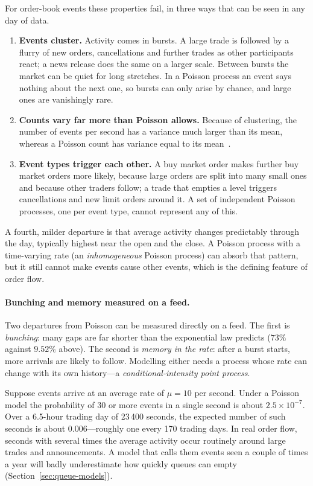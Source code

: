 For order-book events these properties fail, in three ways that can be seen in any day of data.
\begin{enumerate}[leftmargin=1.8em,itemsep=2pt]
\item \textbf{Events cluster.} Activity comes in bursts. A large trade is followed by a flurry of
  new orders, cancellations and further trades as other participants react; a news release does the
  same on a larger scale. Between bursts the market can be quiet for long stretches. In a Poisson
  process an event says nothing about the next one, so bursts can only arise by chance, and large
  ones are vanishingly rare.
\item \textbf{Counts vary far more than Poisson allows.} Because of clustering, the number of events
  per second has a variance much larger than its mean, whereas a Poisson count has variance equal to
  its mean~\citep{bacry2015}.
\item \textbf{Event types trigger each other.} A buy market order makes further buy market orders
  more likely, because large orders are split into many small ones and because other traders
  follow; a trade that empties a level triggers cancellations and new limit orders around it. A
  set of independent Poisson processes, one per event type, cannot represent any of this.
\end{enumerate}
A fourth, milder departure is that average activity changes predictably through the day, typically
highest near the open and the close. A Poisson process with a time-varying rate (an
\emph{inhomogeneous} Poisson process) can absorb that pattern, but it still cannot make events
cause other events, which is the defining feature of order flow.

\paragraph{Bunching and memory measured on a feed.} Two departures from Poisson can be measured directly on a feed. The first is \emph{bunching}: many gaps are
far shorter than the exponential law predicts ($73\%$ against $9.52\%$ above). The second is
\emph{memory in the rate}: after a burst starts, more arrivals are likely to follow. Modelling either
needs a process whose rate can change with its own history---a \emph{conditional-intensity point
process}.

\begin{example}
Suppose events arrive at an average rate of $\mu = 10$ per second. Under a Poisson model the
probability of 30 or more events in a single second is about $2.5 \times 10^{-7}$. Over a 6.5-hour
trading day of 23\,400 seconds, the expected number of such seconds is about $0.006$---roughly one
every 170 trading days. In real order flow, seconds with several times the average activity occur
routinely around large trades and announcements. A model that calls them events seen a couple of times a year will
badly underestimate how quickly queues can empty (Section~\ref{sec:queue-models}).
\end{example}


